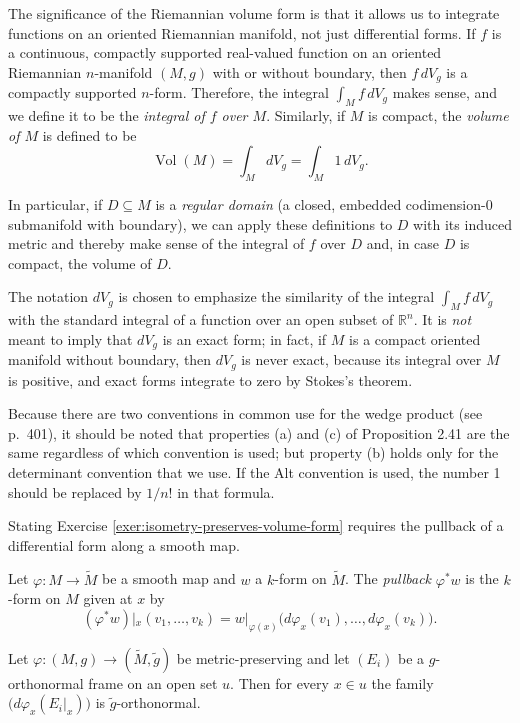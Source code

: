 The significance of the Riemannian volume form is that it allows us to integrate
functions on an oriented Riemannian manifold, not just differential forms. If $f$ is
a continuous, compactly supported real-valued function on an oriented Riemannian
$n$-manifold $(M, g)$ with or without boundary, then $f \, dV_g$ is a compactly supported
$n$-form. Therefore, the integral $\int_M f \, dV_g$ makes sense, and we define it to be the
\emph{integral of $f$ over $M$}. Similarly, if $M$ is compact, the \emph{volume of $M$} is defined to
be
$$\operatorname{Vol}(M) = \int_M dV_g = \int_M 1 \, dV_g.$$

In particular, if $D \subseteq M$ is a \emph{regular domain} (a closed, embedded codimension-$0$
submanifold with boundary), we can apply these definitions to $D$ with its induced
metric and thereby make sense of the integral of $f$ over $D$ and, in case $D$ is compact, the volume of $D$.

The notation $dV_g$ is chosen to emphasize the similarity of the integral $\int_M f \, dV_g$
with the standard integral of a function over an open subset of $\mathbb{R}^n$. It is \emph{not} meant
to imply that $dV_g$ is an exact form; in fact, if $M$ is a compact oriented manifold
without boundary, then $dV_g$ is never exact, because its integral over $M$ is positive, and exact forms integrate to zero by Stokes's theorem.

Because there are two conventions in common use for the wedge product (see p.~401), it should be noted that properties (a) and (c) of Proposition 2.41 are the same regardless of which convention is used; but property (b) holds only for the determinant convention that we use. If the Alt convention is used, the number 1 should be replaced by $1/n!$ in that formula.

Stating Exercise \ref{exer:isometry-preserves-volume-form} requires the pullback of a differential
form along a smooth map.

\begin{definition}
\label{def:pullback-alternating}
\leanok
Let $\varphi : M \to \tilde{M}$ be a smooth map and $w$ a $k$-form on $\tilde{M}$. The
\emph{pullback} $\varphi^* w$ is the $k$-form on $M$ given at $x$ by
\[
(\varphi^* w)|_x(v_1,\ldots,v_k) = w|_{\varphi(x)}\bigl(d\varphi_x(v_1), \ldots, d\varphi_x(v_k)\bigr).
\]
\end{definition}

\begin{lemma}
\label{lem:orthonormal-pushforward}
\leanok
{}
Let $\varphi : (M,g) \to (\tilde{M},\tilde{g})$ be metric-preserving and let $(E_i)$ be a
$g$-orthonormal frame on an open set $u$. Then for every $x \in u$ the family
$\bigl(d\varphi_x(E_i|_x)\bigr)$ is $\tilde{g}$-orthonormal.
\end{lemma}

